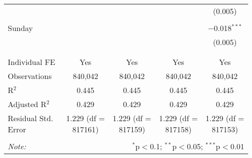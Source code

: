 \documentclass[
]{article}
\begin{document}
\begin{table}[!htbp]
{\begin{tabular}{@{\extracolsep{5pt}}lcccc}
  &  &  &  & (0.005) \\ 
  & & & & \\ 
 Sunday &  &  &  & $-$0.018$^{***}$ \\ 
  &  &  &  & (0.005) \\ 
  & & & & \\ 
\hline \\[-1.8ex] 
Individual FE & Yes & Yes & Yes & Yes \\ 
Observations & 840,042 & 840,042 & 840,042 & 840,042 \\ 
R$^{2}$ & 0.445 & 0.445 & 0.445 & 0.445 \\ 
Adjusted R$^{2}$ & 0.429 & 0.429 & 0.429 & 0.429 \\ 
Residual Std. Error & 1.229 (df = 817161) & 1.229 (df = 817159) & 1.229 (df = 817158) & 1.229 (df = 817153) \\ 
\hline 
\hline \\[-1.8ex] 
\textit{Note:}  & \multicolumn{4}{r}{$^{*}$p$<$0.1; $^{**}$p$<$0.05; $^{***}$p$<$0.01} \\ 
\end{tabular}
} 
\end{table} 
\newpage
\end{document}
